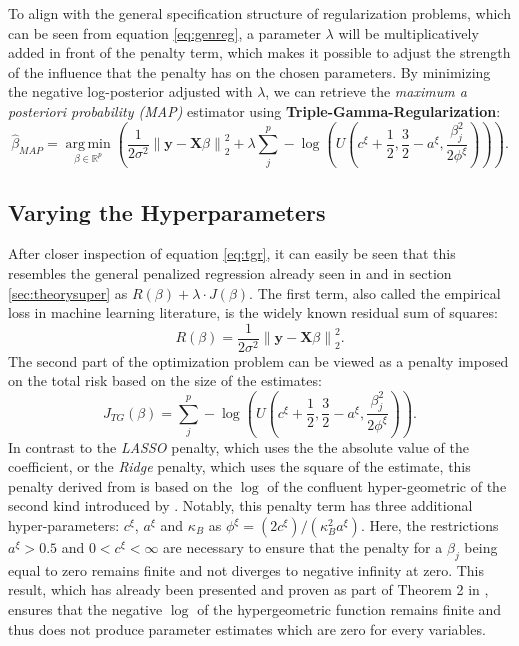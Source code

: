 \documentclass[12pt,a4paper]{article}
\newcommand{\norm}[1]{\left\lVert#1\right\rVert}
\DeclareMathOperator*{\argmin}{arg\,min}
\begin{document}
To align with the general specification structure of regularization problems, which can be seen from equation \ref{eq:genreg}, a parameter $\lambda$ will be multiplicatively added in front of the penalty term, which makes it possible to adjust the strength of the influence that the penalty has on the chosen parameters. By minimizing the negative log-posterior adjusted with $\lambda$, we can retrieve the \textit{maximum a posteriori probability (MAP)} estimator using \textbf{Triple-Gamma-Regularization}:
\begin{equation}\label{eq:tgr}
\hat{\beta}_{MAP} = \underset{\beta \in \mathbb{R}^p}{\argmin} \left(\frac{1}{2\sigma^2}\norm{\mathbf{y} - \mathbf{X}\beta}_2^2 + \lambda \sum_j^p -\log\left(U\left(c^\xi + \frac{1}{2}, \frac{3}{2}-a^\xi, \frac{\beta_j^2}{2\phi^\xi}\right)\right)\right). 
\end{equation}

\newpage
\subsection{Varying the Hyperparameters}
After closer inspection of equation \ref{eq:tgr}, it can easily be seen that this resembles the general penalized regression already seen in \textcite[398]{ESL2009} and in section \ref{sec:theorysuper} as $R(\beta) + \lambda\cdot J(\beta)$. The first term, also called the empirical loss in machine learning literature, is the widely known residual sum of squares:
\[
R(\beta)=\frac{1}{2\sigma^2}\norm{\mathbf{y} - \mathbf{X}\beta}_2^2.
\] 
The second part of the optimization problem can be viewed as a penalty imposed on the total risk based on the size of the estimates:
\[
J_{TG}(\beta) = \sum_j^p -\log\left(U\left(c^\xi + \frac{1}{2}, \frac{3}{2}-a^\xi, \frac{\beta_j^2}{2\phi^\xi}\right)\right).
\]
In contrast to the \textit{LASSO} penalty, which uses the the absolute value of the coefficient, or the \textit{Ridge} penalty, which uses the square of the estimate, this penalty derived from \textcite{TGP2020} is based on the $\log$ of the confluent hyper-geometric of the second kind introduced by \textcite{Tricomi1947}. Notably, this penalty term has three additional hyper-parameters: $c^\xi$, $a^\xi$ and $\kappa_B$ as $\phi^\xi = (2c^\xi)/(\kappa^2_B a^\xi)$. Here, the restrictions $a^\xi>0.5$ and $0 < c^\xi < \infty$ are necessary to ensure that the penalty for a $\beta_j$ being equal to zero remains finite and not diverges to negative infinity at zero. This result, which has already been presented and proven as part of Theorem 2 in \textcite[5--6]{TGP2020}, ensures that the negative $\log$ of the hypergeometric function remains finite and thus does not produce parameter estimates which are zero for every variables.\\
\end{document}
